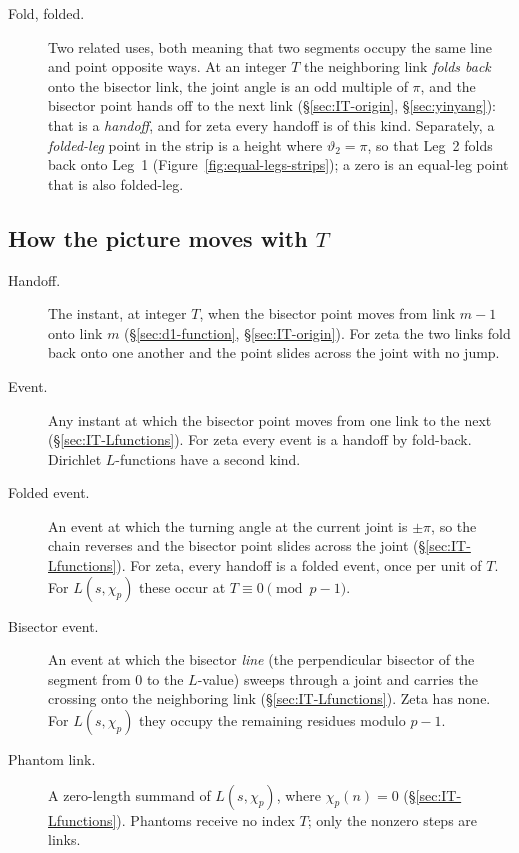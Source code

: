 \documentclass[11pt]{article}
\theoremstyle{definition}
\begin{document}
\begin{description}
\item[Fold, folded.]
Two related uses, both meaning that two segments occupy the same
line and point opposite ways.
At an integer $T$ the neighboring link \emph{folds back} onto the
bisector link, the joint angle is an odd multiple of $\pi$, and
the bisector point hands off to the next link
(\S\ref{sec:IT-origin}, \S\ref{sec:yinyang}): that is a
\emph{handoff}, and for zeta every handoff is of this kind.
Separately, a \emph{folded-leg} point in the strip is a height
where $\vartheta_2=\pi$, so that Leg~2 folds back onto Leg~1
(Figure~\ref{fig:equal-legs-strips}); a zero is an equal-leg point
that is also folded-leg.
\end{description}

\subsection*{How the picture moves with $T$}

\begin{description}
\item[Handoff.]
The instant, at integer $T$, when the bisector point moves from
link $m-1$ onto link $m$
(\S\ref{sec:d1-function}, \S\ref{sec:IT-origin}).
For zeta the two links fold back onto one another and the point
slides across the joint with no jump.

\item[Event.]
Any instant at which the bisector point moves from one link to the
next (\S\ref{sec:IT-Lfunctions}).
For zeta every event is a handoff by fold-back.
Dirichlet $L$-functions have a second kind.

\item[Folded event.]
An event at which the turning angle at the current joint is
$\pm\pi$, so the chain reverses and the bisector point slides
across the joint (\S\ref{sec:IT-Lfunctions}).
For zeta, every handoff is a folded event, once per unit of $T$.
For $L(s,\chi_p)$ these occur at $T\equiv0\pmod{p-1}$.

\item[Bisector event.]
An event at which the bisector \emph{line} (the perpendicular
bisector of the segment from $0$ to the $L$-value) sweeps through
a joint and carries the crossing onto the neighboring link
(\S\ref{sec:IT-Lfunctions}).
Zeta has none.
For $L(s,\chi_p)$ they occupy the remaining residues modulo
$p-1$.

\item[Phantom link.]
A zero-length summand of $L(s,\chi_p)$, where $\chi_p(n)=0$
(\S\ref{sec:IT-Lfunctions}).
Phantoms receive no index $T$; only the nonzero steps are links.
\end{description}
\end{document}
